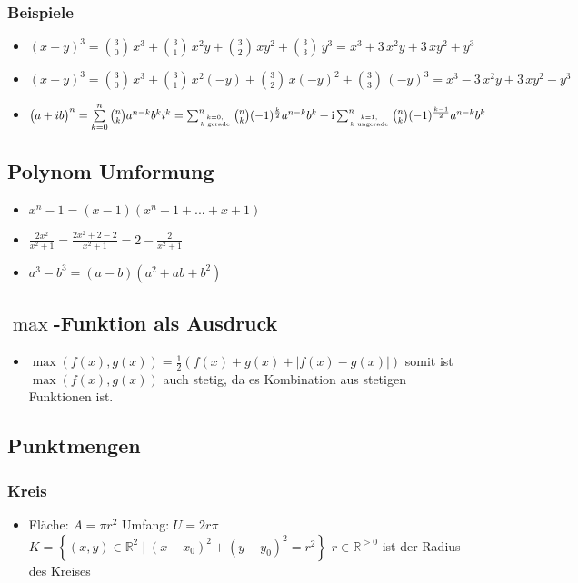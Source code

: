 \documentclass[a3paper, 11pt, landscape]{scrartcl}
\begin{document}
\begin{multicols*}{3}
	\subsubsection{Beispiele}
	\begin{itemize}
	    \item $(x+y)^3=\binom{3}{0}\, x^{3} + \binom{3}{1}\, x^{2}y + \binom{3}{2}\, xy^{2} + \binom{3}{3}\, y^{3}=x^3+3\,x^2y+3\,xy^2+y^3$
	    \item $(x-y)^3=\binom{3}{0}\, x^{3} + \binom{3}{1}\, x^{2}(-y) + \binom{3}{2}\, x(-y)^{2} + \binom{3}{3}\,(-y)^{3}=x^3-3\,x^2y+3\,xy^2-y^3$
	    \item $\big(a + i b\big)^n = \sum\limits_{k=0}^n \binom{n}{k} a^{n-k} b^k i^k=\sum_{k=0, \atop k\text{ gerade}}^n \binom nk (-1)^{\frac k2} a^{n-k}b^k + \mathrm i \sum_{k=1, \atop k\text{ ungerade}}^n \binom nk (-1)^{\frac{k-1}2} a^{n-k}b^k$
	\end{itemize}
	\subsection{Polynom Umformung}
	\begin{itemize}
	    \item $x^n-1= (x-1) (x^n-1+...+x+1)$
	    \item $\frac{2x^2}{x^2+1}=\frac{2x^2+2-2}{x^2+1}= 2-\frac{2}{x^2+1}$
	    \item $a^{3}-b^{3}=(a-b)\left(a^{2}+a b+b^{2}\right)$
	\end{itemize}
	
	\subsection{$\max$-Funktion als Ausdruck}
	\begin{itemize}
	    \item $\max (f(x),g(x))=\frac{1}{2}(f(x)+g(x) + | f(x)-g(x) |)$ somit ist $\max (f(x),g(x))$ auch stetig, da es Kombination aus stetigen Funktionen ist. 
	\end{itemize}
	
	\subsection{Punktmengen}
	\subsubsection{Kreis}
	\begin{itemize}
	    \item Fläche: $A=\pi r^2$ \hspace{30pt} Umfang: $U=2r\pi$
		$K=\left\{(x, y)\in \mathbb{R}^2 \mid (x-x_0)^2+(y-y_0)^2 = r^2 \right\}$	
		$r \in \mathbb{R}^{>0}$ ist der Radius des Kreises
	\end{itemize}
		

\end{multicols*}
\end{document}

